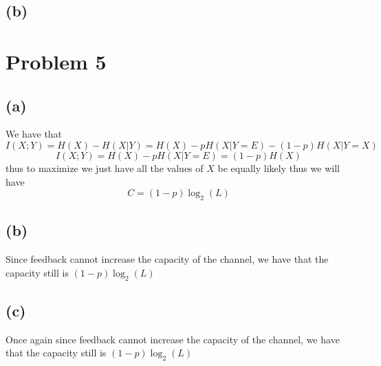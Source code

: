 \subsection*{(b)}

\section*{Problem 5}
\subsection*{(a)}
We have that 
$$I(X;Y)=H(X)-H(X|Y)=H(X)-pH(X|Y=E)-(1-p)H(X|Y=X)$$
$$I(X;Y)=H(X)-pH(X|Y=E)=(1-p)H(X)$$
thus to maximize we just have all the values of $X$ be equally likely
thus we will have
$$\boxed{C=(1-p)\log_2(L)}$$
\subsection*{(b)}
Since feedback cannot increase the capacity of the channel, we have that
the capacity still is $\boxed{(1-p)\log_2(L)}$
\subsection*{(c)}
Once again since feedback cannot increase the capacity of the channel, we have that
the capacity still is $\boxed{(1-p)\log_2(L)}$

